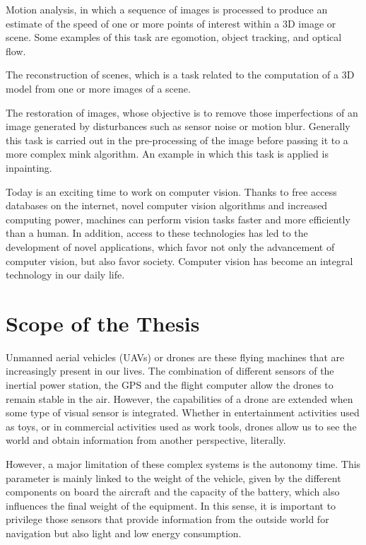 Motion analysis, in which a sequence of images is processed to produce an estimate of the speed of one or more points of interest within a 3D image or scene. Some examples of this task are egomotion, object tracking, and optical flow.

The reconstruction of scenes, which is a task related to the computation of a 3D model from one or more images of a scene.

The restoration of images, whose objective is to remove those imperfections of an image generated by disturbances such as sensor noise or motion blur. Generally this task is carried out in the pre-processing of the image before passing it to a more complex mink algorithm. An example in which this task is applied is inpainting.

Today is an exciting time to work on computer vision. Thanks to free access databases on the internet, novel computer vision algorithms and increased computing power, machines can perform vision tasks faster and more efficiently than a human. In addition, access to these technologies has led to the development of novel applications, which favor not only the advancement of computer vision, but also favor society. Computer vision has become an integral technology in our daily life.

\section{Scope of the Thesis}

Unmanned aerial vehicles (UAVs) or drones are these flying machines that are increasingly present in our lives. The combination of different sensors of the inertial power station, the GPS and the flight computer allow the drones to remain stable in the air. However, the capabilities of a drone are extended when some type of visual sensor is integrated. Whether in entertainment activities used as toys, or in commercial activities used as work tools, drones allow us to see the world and obtain information from another perspective, literally.

However, a major limitation of these complex systems is the autonomy time. This parameter is mainly linked to the weight of the vehicle, given by the different components on board the aircraft and the capacity of the battery, which also influences the final weight of the equipment. In this sense, it is important to privilege those sensors that provide information from the outside world for navigation but also light and low energy consumption.

